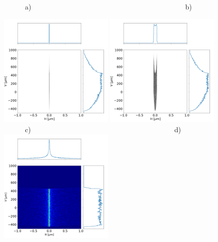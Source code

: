 \documentclass{iucr}              %
\begin{document}
\begin{figure}\label{fig:pointToSegment}
\flushleft
~~~~~~a)~~~~~~~~~~~~~~~~~~~~~~~~~~~~~~~~~~~~~~~~~~~~b)\\
\centering

\includegraphics[width=0.49\textwidth]{figures/p2s_V_z.png}
\includegraphics[width=0.49\textwidth]{figures/p2s_K_z.png} \\
\flushleft
~~~~~~c)~~~~~~~~~~~~~~~~~~~~~~~~~~~~~~~~~~~~~~~~~d)\\
\includegraphics[width=0.49\textwidth]{figures/p2s_parabolic-cone_z.png}

\end{figure}
\end{document}

